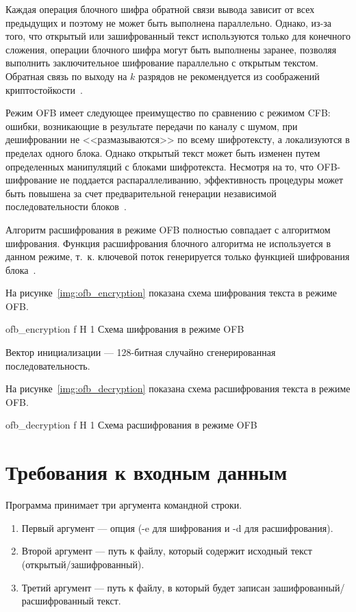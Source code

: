 \documentclass{bmstu}
\begin{document}
Каждая операция блочного шифра обратной связи вывода зависит от всех предыдущих и поэтому не может быть выполнена параллельно. 
Однако, из-за того, что открытый или зашифрованный текст используются только для конечного сложения, операции блочного шифра могут быть выполнены заранее, позволяя выполнить заключительное шифрование параллельно с открытым текстом. 
Обратная связь по выходу на $k$ разрядов не рекомендуется из соображений криптостойкости~\cite{wiki-ofb}.

Режим OFB имеет следующее преимущество по сравнению с режимом CFB: ошибки, возникающие в результате передачи по каналу с шумом, при дешифровании не <<размазываются>> по всему шифротексту, а локализуются в пределах одного блока. 
Однако открытый текст может быть изменен путем определенных манипуляций с блоками шифротекста. 
Несмотря на то, что OFB-шифрование не поддается распараллеливанию, эффективность процедуры может быть повышена за счет предварительной генерации независимой последовательности блоков~\cite{wiki-ofb}.

Алгоритм расшифрования в режиме OFB полностью совпадает с алгоритмом шифрования. Функция расшифрования блочного алгоритма не используется в данном режиме, т.~к. ключевой поток генерируется только функцией шифрования блока~\cite{wiki-ofb}.

На рисунке~\ref{img:ofb_encryption} показана схема шифрования текста в режиме OFB.

    {ofb_encryption}
    {f}
    {H}
    {1\textwidth}
    {Схема шифрования в режиме OFB~\cite{wiki-ofb}}
    
Вектор инициализации --- 128-битная случайно сгенерированная последовательность.

На рисунке~\ref{img:ofb_decryption} показана схема расшифрования текста в режиме OFB.

    {ofb_decryption}
    {f}
    {H}
    {1\textwidth}
    {Схема расшифрования в режиме OFB~\cite{wiki-ofb}}

\chapter{Требования к входным данным}

Программа принимает три аргумента командной строки.
\begin{enumerate}
\item Первый аргумент --- опция (-e для шифрования и -d для расшифрования). 
\item Второй аргумент --- путь к файлу, который содержит исходный текст (открытый/зашифрованный).
\item Третий аргумент --- путь к файлу, в который будет записан зашифрованный/расшифрованный текст. 
\end{enumerate}
\end{document}
